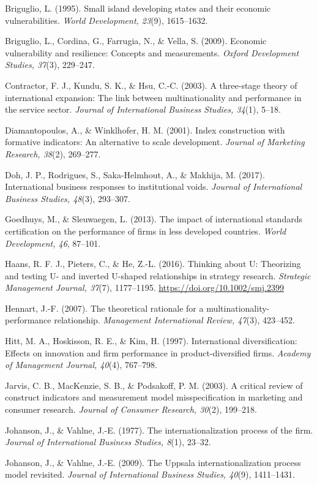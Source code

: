 \documentclass[
  12pt]{article}
\begin{document}
Briguglio, L. (1995). Small island developing states and their economic
vulnerabilities. \emph{World Development, 23}(9), 1615--1632.

Briguglio, L., Cordina, G., Farrugia, N., \& Vella, S. (2009). Economic
vulnerability and resilience: Concepts and measurements. \emph{Oxford
Development Studies, 37}(3), 229--247.

Contractor, F. J., Kundu, S. K., \& Hsu, C.-C. (2003). A three-stage
theory of international expansion: The link between multinationality and
performance in the service sector. \emph{Journal of International
Business Studies, 34}(1), 5--18.

Diamantopoulos, A., \& Winklhofer, H. M. (2001). Index construction with
formative indicators: An alternative to scale development. \emph{Journal
of Marketing Research, 38}(2), 269--277.

Doh, J. P., Rodrigues, S., Saka-Helmhout, A., \& Makhija, M. (2017).
International business responses to institutional voids. \emph{Journal
of International Business Studies, 48}(3), 293--307.

Goedhuys, M., \& Sleuwaegen, L. (2013). The impact of international
standards certification on the performance of firms in less developed
countries. \emph{World Development, 46}, 87--101.

Haans, R. F. J., Pieters, C., \& He, Z.-L. (2016). Thinking about U:
Theorizing and testing U- and inverted U-shaped relationships in
strategy research. \emph{Strategic Management Journal, 37}(7),
1177--1195. \url{https://doi.org/10.1002/smj.2399}

Hennart, J.-F. (2007). The theoretical rationale for a
multinationality-performance relationship. \emph{Management
International Review, 47}(3), 423--452.

Hitt, M. A., Hoskisson, R. E., \& Kim, H. (1997). International
diversification: Effects on innovation and firm performance in
product-diversified firms. \emph{Academy of Management Journal, 40}(4),
767--798.

Jarvis, C. B., MacKenzie, S. B., \& Podsakoff, P. M. (2003). A critical
review of construct indicators and measurement model misspecification in
marketing and consumer research. \emph{Journal of Consumer Research,
30}(2), 199--218.

Johanson, J., \& Vahlne, J.-E. (1977). The internationalization process
of the firm. \emph{Journal of International Business Studies, 8}(1),
23--32.

Johanson, J., \& Vahlne, J.-E. (2009). The Uppsala internationalization
process model revisited. \emph{Journal of International Business
Studies, 40}(9), 1411--1431.
\end{document}
